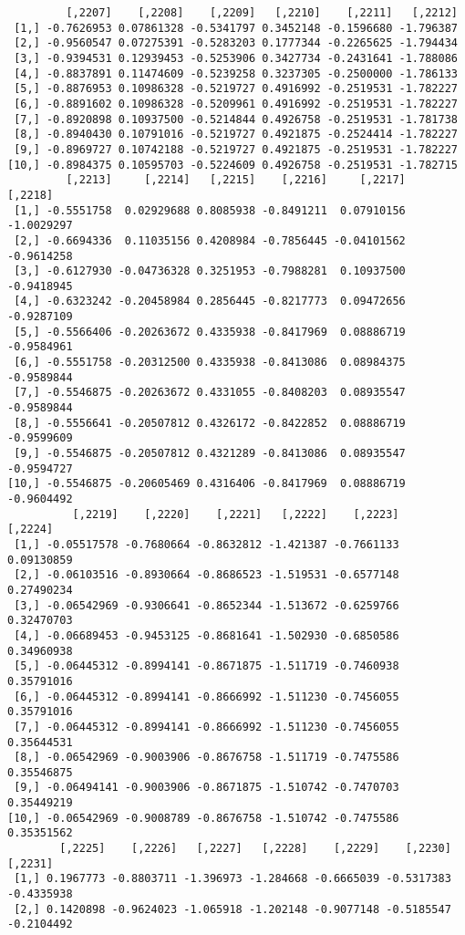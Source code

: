 \documentclass[
  letterpaper,
  DIV=11,
  numbers=noendperiod]{scrreprt}
\begin{document}
\begin{verbatim}
         [,2207]    [,2208]    [,2209]   [,2210]    [,2211]   [,2212]
 [1,] -0.7626953 0.07861328 -0.5341797 0.3452148 -0.1596680 -1.796387
 [2,] -0.9560547 0.07275391 -0.5283203 0.1777344 -0.2265625 -1.794434
 [3,] -0.9394531 0.12939453 -0.5253906 0.3427734 -0.2431641 -1.788086
 [4,] -0.8837891 0.11474609 -0.5239258 0.3237305 -0.2500000 -1.786133
 [5,] -0.8876953 0.10986328 -0.5219727 0.4916992 -0.2519531 -1.782227
 [6,] -0.8891602 0.10986328 -0.5209961 0.4916992 -0.2519531 -1.782227
 [7,] -0.8920898 0.10937500 -0.5214844 0.4926758 -0.2519531 -1.781738
 [8,] -0.8940430 0.10791016 -0.5219727 0.4921875 -0.2524414 -1.782227
 [9,] -0.8969727 0.10742188 -0.5219727 0.4921875 -0.2519531 -1.782227
[10,] -0.8984375 0.10595703 -0.5224609 0.4926758 -0.2519531 -1.782715
         [,2213]     [,2214]   [,2215]    [,2216]     [,2217]    [,2218]
 [1,] -0.5551758  0.02929688 0.8085938 -0.8491211  0.07910156 -1.0029297
 [2,] -0.6694336  0.11035156 0.4208984 -0.7856445 -0.04101562 -0.9614258
 [3,] -0.6127930 -0.04736328 0.3251953 -0.7988281  0.10937500 -0.9418945
 [4,] -0.6323242 -0.20458984 0.2856445 -0.8217773  0.09472656 -0.9287109
 [5,] -0.5566406 -0.20263672 0.4335938 -0.8417969  0.08886719 -0.9584961
 [6,] -0.5551758 -0.20312500 0.4335938 -0.8413086  0.08984375 -0.9589844
 [7,] -0.5546875 -0.20263672 0.4331055 -0.8408203  0.08935547 -0.9589844
 [8,] -0.5556641 -0.20507812 0.4326172 -0.8422852  0.08886719 -0.9599609
 [9,] -0.5546875 -0.20507812 0.4321289 -0.8413086  0.08935547 -0.9594727
[10,] -0.5546875 -0.20605469 0.4316406 -0.8417969  0.08886719 -0.9604492
          [,2219]    [,2220]    [,2221]   [,2222]    [,2223]    [,2224]
 [1,] -0.05517578 -0.7680664 -0.8632812 -1.421387 -0.7661133 0.09130859
 [2,] -0.06103516 -0.8930664 -0.8686523 -1.519531 -0.6577148 0.27490234
 [3,] -0.06542969 -0.9306641 -0.8652344 -1.513672 -0.6259766 0.32470703
 [4,] -0.06689453 -0.9453125 -0.8681641 -1.502930 -0.6850586 0.34960938
 [5,] -0.06445312 -0.8994141 -0.8671875 -1.511719 -0.7460938 0.35791016
 [6,] -0.06445312 -0.8994141 -0.8666992 -1.511230 -0.7456055 0.35791016
 [7,] -0.06445312 -0.8994141 -0.8666992 -1.511230 -0.7456055 0.35644531
 [8,] -0.06542969 -0.9003906 -0.8676758 -1.511719 -0.7475586 0.35546875
 [9,] -0.06494141 -0.9003906 -0.8671875 -1.510742 -0.7470703 0.35449219
[10,] -0.06542969 -0.9008789 -0.8676758 -1.510742 -0.7475586 0.35351562
        [,2225]    [,2226]   [,2227]   [,2228]    [,2229]    [,2230]    [,2231]
 [1,] 0.1967773 -0.8803711 -1.396973 -1.284668 -0.6665039 -0.5317383 -0.4335938
 [2,] 0.1420898 -0.9624023 -1.065918 -1.202148 -0.9077148 -0.5185547 -0.2104492

\end{verbatim}
\end{document}
